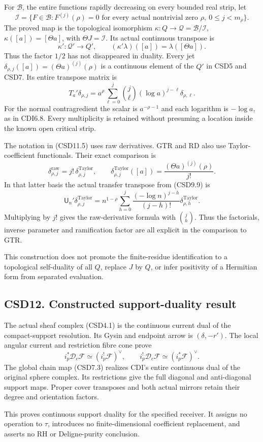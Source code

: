For \(\mathcal B\), the entire functions rapidly decreasing on every
bounded real strip, let \[
\mathcal I=\{F\in\mathcal B:F^{(j)}(\rho)=0
\text{ for every actual nontrivial zero }\rho,\ 0\le j<m_\rho\}.
\] The proved map is the topological isomorphism
\(\kappa:Q\to\mathcal Q=\mathcal B/\mathcal I\),
\(\kappa([a])=[\Theta a]\), with \(\Theta J=\mathcal I\). Its actual
continuous transpose is \[
\kappa':\mathcal Q'\to Q',\qquad
(\kappa'\lambda)([a])=\lambda([\Theta a]).
\tag{CSD11.4}
\] Thus the factor \(1/2\) has not disappeared in duality. Every jet
\(\delta_{\rho,j}([a])=(\Theta a)^{(j)}(\rho)\) is a continuous element
of the \(Q'\) in CSD5 and CSD7. Its entire transpose matrix is \[
T_a'\delta_{\rho,j}
=a^\rho\sum_{\ell=0}^j\binom j\ell
(\log a)^{j-\ell}\delta_{\rho,\ell}.
\tag{CSD11.5}
\] For the normal contragredient the scalar is \(a^{-\rho-1}\) and each
logarithm is \(-\log a\), as in CDI6.8. Every multiplicity is retained
without presuming a location inside the known open critical strip.

The notation in (CSD11.5) uses raw derivatives. GTR and RD also use
Taylor-coefficient functionals. Their exact comparison is \[
\delta_{\rho,j}^{\mathrm{raw}}
=j!\,\delta_{\rho,j}^{\mathrm{Taylor}},
\qquad
\delta_{\rho,j}^{\mathrm{Taylor}}([a])
=\frac{(\Theta a)^{(j)}(\rho)}{j!}.
\tag{CSD11.6}
\] In that latter basis the actual transfer transpose from (CSD9.9) is
\[
\mathsf U_n'\delta_{\rho,j}^{\mathrm{Taylor}}
=n^{1-\rho}\sum_{h=0}^j
\frac{(-\log n)^{j-h}}{(j-h)!}
\delta_{\rho,h}^{\mathrm{Taylor}}.
\tag{CSD11.7}
\] Multiplying by \(j!\) gives the raw-derivative formula with
\(\binom jh\). Thus the factorials, inverse parameter and ramification
factor are all explicit in the comparison to GTR.

This construction does not promote the finite-residue identification to
a topological self-duality of all \(Q\), replace \(J\) by \(Q\), or
infer positivity of a Hermitian form from separated evaluation.

\subsection{CSD12. Constructed support-duality
result}\label{csd12.-constructed-support-duality-result}

The actual sheaf complex (CSD4.1) is the continuous current dual of the
compact-support resolution. Its Gysin and endpoint arrow is
\((\delta,-r')\). The local angular current and restriction fibre cone
prove \[
i_p^*\mathscr D_c\mathscr F\simeq(i_p^!\mathscr F)^\vee,\qquad
i_p^!\mathscr D_c\mathscr F\simeq(i_p^*\mathscr F)^\vee.
\] The global chain map (CSD7.3) realizes CDI's entire continuous dual
of the original sphere complex. Its restrictions give the full diagonal
and anti-diagonal support maps. Proper cover transposes and both actual
mirrors retain their degree and orientation factors.

This proves continuous support duality for the specified receiver. It
assigns no operation to \(\tau\), introduces no finite-dimensional
coefficient replacement, and asserts no RH or Deligne-purity conclusion.
